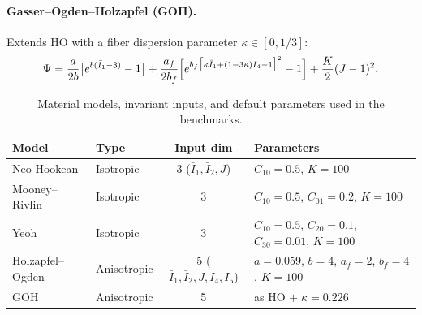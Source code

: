 \paragraph{Gasser--Ogden--Holzapfel (GOH).}
Extends HO with a fiber dispersion parameter $\kappa \in [0, 1/3]$:
\begin{equation}
  \Psi = \frac{a}{2b}\bigl[e^{b(\bar{I}_1 - 3)} - 1\bigr]
       + \frac{a_f}{2b_f}\Bigl[e^{b_f\bigl[\kappa \bar{I}_1
         + (1-3\kappa)I_4 - 1\bigr]^2} - 1\Bigr]
       + \frac{K}{2}(J - 1)^2.
  \label{eq:goh}
\end{equation}

\begin{table}[htbp]
\centering
\caption{Material models, invariant inputs, and default parameters used in the
  benchmarks.}
\label{tab:materials}
\begin{tabular}{@{}llcl@{}}
\toprule
\textbf{Model} & \textbf{Type} & \textbf{Input dim} & \textbf{Parameters} \\
\midrule
Neo-Hookean    & Isotropic   & 3 ($\bar{I}_1, \bar{I}_2, J$)
  & $C_{10}=0.5$, $K=100$ \\
Mooney--Rivlin & Isotropic   & 3
  & $C_{10}=0.5$, $C_{01}=0.2$, $K=100$ \\
Yeoh           & Isotropic   & 3
  & $C_{10}=0.5$, $C_{20}=0.1$, $C_{30}=0.01$, $K=100$ \\
\midrule
Holzapfel--Ogden & Anisotropic & 5 ($\bar{I}_1, \bar{I}_2, J, I_4, I_5$)
  & $a=0.059$, $b=4$, $a_f=2$, $b_f=4$, $K=100$ \\
GOH              & Anisotropic & 5
  & as HO $+\;\kappa=0.226$ \\
\bottomrule
\end{tabular}
\end{table}
